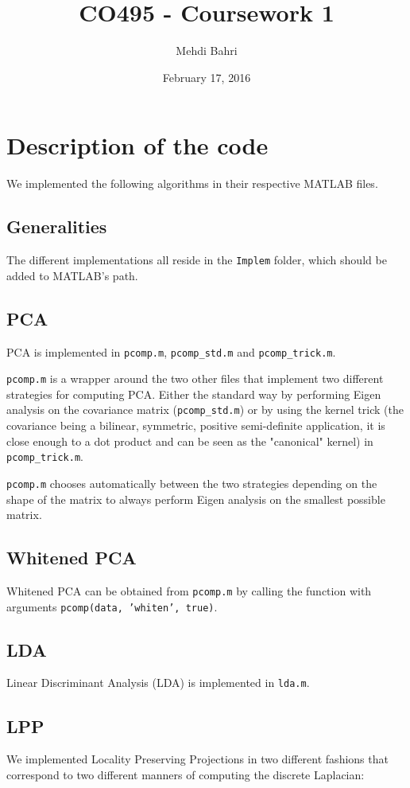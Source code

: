 \documentclass[10pt, a4paper]{article}
\title{CO495 - Coursework 1}
\author{Mehdi Bahri}
\date{February 17, 2016}
\begin{document}
\maketitle

\tableofcontents

\section{Description of the code}
We implemented the following algorithms in their respective MATLAB files.

\subsection{Generalities}
The different implementations all reside in the \texttt{Implem} folder, which should be added to MATLAB's path.

\subsection{PCA}
PCA is implemented in \texttt{pcomp.m}, \texttt{pcomp\_std.m} and \texttt{pcomp\_trick.m}.

\texttt{pcomp.m} is a wrapper around the two other files that implement two different strategies for computing PCA. Either the standard way by performing Eigen analysis on the covariance matrix (\texttt{pcomp\_std.m}) or by using the kernel trick (the covariance being a bilinear, symmetric, positive semi-definite application, it is close enough to a dot product and can be seen as the "canonical" kernel) in \texttt{pcomp\_trick.m}.

\texttt{pcomp.m} chooses automatically between the two strategies depending on the shape of the matrix to always perform Eigen analysis on the smallest possible matrix.

\subsection{Whitened PCA}

Whitened PCA can be obtained from \texttt{pcomp.m} by calling the function with arguments \texttt{pcomp(data, 'whiten', true)}.

\subsection{LDA}
Linear Discriminant Analysis (LDA) is implemented in \texttt{lda.m}.

\subsection{LPP}
We implemented Locality Preserving Projections in two different fashions that correspond to two different manners of computing the discrete Laplacian:
\end{document}
